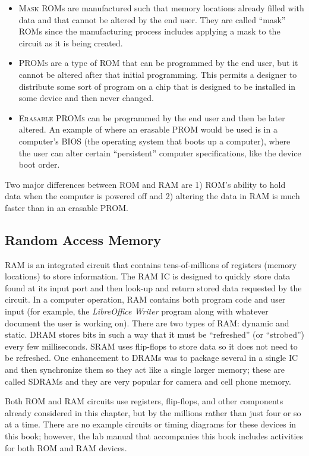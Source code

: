 \begin{itemize}
  \item \textsc{Mask} \acp{ROM} are manufactured such that memory locations already filled with data and that cannot be altered by the end user. They are called ``mask'' \acp{ROM} since the manufacturing process includes applying a mask to the circuit as it is being created. 
  \item \textsc{\acp{PROM}} are a type of \ac{ROM} that can be programmed by the end user, but it cannot be altered after that initial programming. This permits a designer to distribute some sort of program on a chip that is designed to be installed in some device and then never changed.
  \item \textsc{Erasable \acp{PROM}} can be programmed by the end user and then be later altered. An example of where an erasable \ac{PROM} would be used is in a computer's \ac{BIOS} (the operating system that boots up a computer), where the user can alter certain ``persistent'' computer specifications, like the device boot order. 
\end{itemize}

Two major differences between \ac{ROM} and \ac{RAM} are 1) \ac{ROM}'s ability to hold data when the computer is powered off and 2) altering the data in \ac{RAM} is much faster than in an erasable \ac{PROM}.

\subsection{Random Access Memory}
\label{SL:subsec:random_access_memory}

\acf{RAM} is an integrated circuit that contains tens-of-millions of registers (memory locations) to store information. The \ac{RAM} \ac{IC} is designed to quickly store data found at its input port and then look-up and return stored data requested by the circuit. In a computer operation, \ac{RAM} contains both program code and user input (for example, the \emph{LibreOffice Writer} program along with whatever document the user is working on). There are two types of \ac{RAM}: dynamic and static. \ac{DRAM} stores bits in such a way that it must be ``refreshed'' (or ``strobed'') every few milliseconds. \ac{SRAM} uses flip-flops to store data so it does not need to be refreshed. One enhancement to \acp{DRAM} was to package several in a single \ac{IC} and then synchronize them so they act like a single larger memory; these are called \acp{SDRAM} and they are very popular for camera and cell phone memory.

Both \ac{ROM} and \ac{RAM} circuits use registers, flip-flops, and other components already considered in this chapter, but by the millions rather than just four or so at a time. There are no example circuits or timing diagrams for these devices in this book; however, the lab manual that accompanies this book includes activities for both \ac{ROM} and \ac{RAM} devices.

















